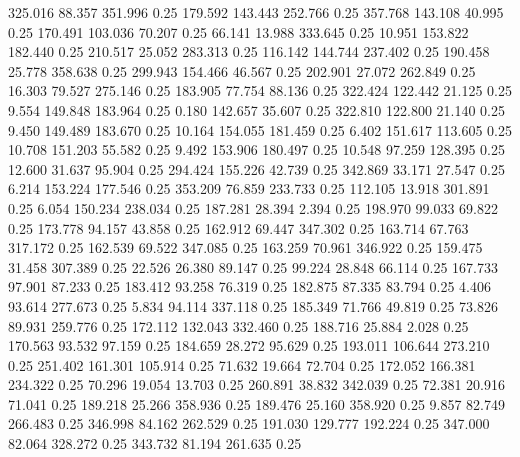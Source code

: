  325.016   88.357  351.996         0.25
 179.592  143.443  252.766         0.25
 357.768  143.108   40.995         0.25
 170.491  103.036   70.207         0.25
  66.141   13.988  333.645         0.25
  10.951  153.822  182.440         0.25
 210.517   25.052  283.313         0.25
 116.142  144.744  237.402         0.25
 190.458   25.778  358.638         0.25
 299.943  154.466   46.567         0.25
 202.901   27.072  262.849         0.25
  16.303   79.527  275.146         0.25
 183.905   77.754   88.136         0.25
 322.424  122.442   21.125         0.25
   9.554  149.848  183.964         0.25
   0.180  142.657   35.607         0.25
 322.810  122.800   21.140         0.25
   9.450  149.489  183.670         0.25
  10.164  154.055  181.459         0.25
   6.402  151.617  113.605         0.25
  10.708  151.203   55.582         0.25
   9.492  153.906  180.497         0.25
  10.548   97.259  128.395         0.25
  12.600   31.637   95.904         0.25
 294.424  155.226   42.739         0.25
 342.869   33.171   27.547         0.25
   6.214  153.224  177.546         0.25
 353.209   76.859  233.733         0.25
 112.105   13.918  301.891         0.25
   6.054  150.234  238.034         0.25
 187.281   28.394    2.394         0.25
 198.970   99.033   69.822         0.25
 173.778   94.157   43.858         0.25
 162.912   69.447  347.302         0.25
 163.714   67.763  317.172         0.25
 162.539   69.522  347.085         0.25
 163.259   70.961  346.922         0.25
 159.475   31.458  307.389         0.25
  22.526   26.380   89.147         0.25
  99.224   28.848   66.114         0.25
 167.733   97.901   87.233         0.25
 183.412   93.258   76.319         0.25
 182.875   87.335   83.794         0.25
   4.406   93.614  277.673         0.25
   5.834   94.114  337.118         0.25
 185.349   71.766   49.819         0.25
  73.826   89.931  259.776         0.25
 172.112  132.043  332.460         0.25
 188.716   25.884    2.028         0.25
 170.563   93.532   97.159         0.25
 184.659   28.272   95.629         0.25
 193.011  106.644  273.210         0.25
 251.402  161.301  105.914         0.25
  71.632   19.664   72.704         0.25
 172.052  166.381  234.322         0.25
  70.296   19.054   13.703         0.25
 260.891   38.832  342.039         0.25
  72.381   20.916   71.041         0.25
 189.218   25.266  358.936         0.25
 189.476   25.160  358.920         0.25
   9.857   82.749  266.483         0.25
 346.998   84.162  262.529         0.25
 191.030  129.777  192.224         0.25
 347.000   82.064  328.272         0.25
 343.732   81.194  261.635         0.25
